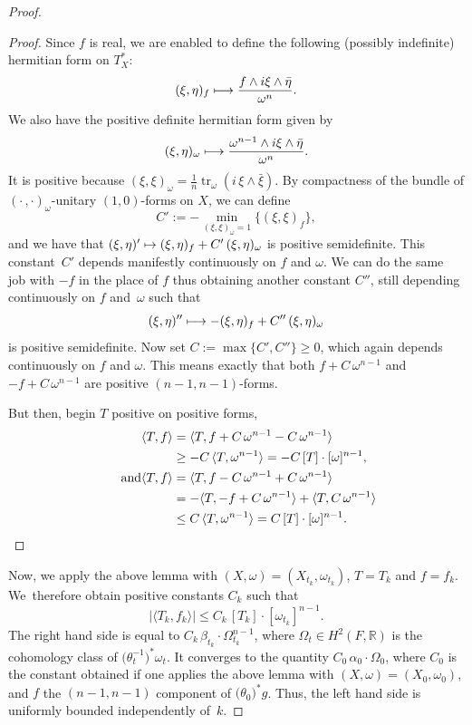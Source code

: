 \documentclass[11pt]{article}
\newcommand\mto{\mathchoice{\longmapsto}{\mapsto}{\mapsto}{\mapsto}}
\theoremstyle{plain}
\theoremstyle{definition}
\DeclareMathOperator{\tr}{tr}
\begin{document}
\begin{appendix}
\begin{proof}
\begin{proof}
Since $f$ is real, we are enabled to define the following (possibly indefinite) hermitian form on $T_X^*$:
\[
(\xi,\eta)_f\mto \frac{f\wedge i\xi\wedge\bar\eta}{\omega^n}.
\]
We also have the positive definite hermitian form given by
\[
(\xi,\eta)_\omega\mto \frac{\omega^{n-1}\wedge i\xi\wedge\bar\eta}{\omega^n}.
\]
It is positive because $(\xi,\xi)_\omega=\frac 1n\tr_\omega(i\,\xi\wedge\bar\xi)$.
By compactness of the bundle of $(\cdot\,,\cdot)_\omega$-unitary $(1,0)$-forms on $X$, we can define
\[
C':=-\min_{(\xi,\xi)_\omega=1}\{(\xi,\xi)_f\},
\]
and we have that $(\xi,\eta)'\mto (\xi,\eta)_f+C'\,(\xi,\eta)_\omega$ is positive semidefinite. This constant~$C'$ depends manifestly continuously on $f$ and $\omega$. We can do the same job with $-f$ in the place of $f$ thus obtaining another constant $C''$, still depending continuously on $f$ and~$\omega$ such that
\[
(\xi,\eta)''\mto -(\xi,\eta)_f+C''\,(\xi,\eta)_\omega
\]
is positive semidefinite. Now set $C:=\max\{C',C''\}\ge 0$, which again depends continuously on $f$ and $\omega$. This means exactly that both $f+C\,\omega^{n-1}$ and $-f+C\,\omega^{n-1}$ are positive $(n-1,n-1)$-forms.

But then, begin $T$ positive on positive forms,
\begin{align*}
\langle T, f\rangle &= \langle T, f+C\,\omega^{n-1}-C\,\omega^{n-1}\rangle \\
&\ge -C\,\langle T, \omega^{n-1}\rangle=-C\, [T]\cdot[\omega]^{n-1},
\\
\tag*{and}
\langle T, f\rangle &= \langle T, f-C\,\omega^{n-1}+C\,\omega^{n-1}\rangle \\
&= -\langle T,-f+C\,\omega^{n-1}\rangle+\langle T, C\,\omega^{n-1}\rangle\\
& \le C\,\langle T, \omega^{n-1}\rangle=C\, [T]\cdot[\omega]^{n-1}.\qedhere
\end{align*}
\end{proof}

Now, we apply the above lemma with $(X,\omega)=(X_{t_k},\omega_{t_k})$, $T=T_k$ and $f=f_k$. We~therefore obtain positive constants $C_k$ such that
\[
|\langle T_k,f_k\rangle|\le C_k\,[T_k]\cdot[\omega_{t_k}]^{n-1}.
\]
The right hand side is equal to $C_k\,\beta_{t_k}\cdot\Omega_{t_k}^{n-1}$, where $\Omega_t\in H^2(F,\mathbb R)$ is the cohomology class of $\bigl(\theta_t^{-1}\bigr)^*\omega_t$. It converges to the quantity $C_0\,\alpha_0\cdot\Omega_0$, where $C_0$ is the constant obtained if one applies the above lemma with $(X,\omega)=(X_{0},\omega_{0})$, and $f$ the $(n-1,n-1)$ component of $\bigl(\theta_{0}\bigr)^*g$. Thus, the left hand side is uniformly bounded independently of~$k$.


\end{proof}
\end{appendix}
\end{document}

